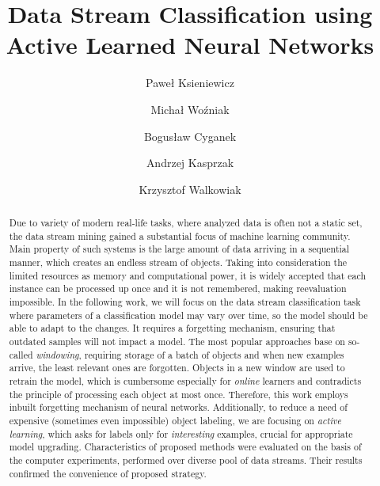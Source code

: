 \begin{frontmatter}

\title{Data Stream Classification using Active Learned Neural Networks}

\author[pwr]{Pawe\l{} Ksieniewicz}

\author[pwr]{Micha\l{} Wo\'zniak}

\author[bc]{Bogus\l{}aw Cyganek}

\author[pwr]{Andrzej Kasprzak}

\author[pwr]{Krzysztof Walkowiak}

\address[pwr]{Department of Systems and Computer Networks, Wroc\l{}aw University of Science and Technology, Wyb. Wyspia{\'n}skiego 27, 50-370 Wroc\l{}aw, Poland}
\address[bc]{AGH University of Science and Technology
Al. Mickiewicza 30, 30-059 Krak\'ow, Poland}


\begin{abstract}
Due to variety of modern real-life tasks, where analyzed data is often not a static set, the data stream mining gained a substantial focus of machine learning community. Main property of such systems is the large amount of data arriving in a sequential manner, which creates an endless stream of objects. %
Taking into consideration the limited resources as memory and computational power, it is widely accepted that each instance can be processed up once and it is not remembered, making reevaluation impossible.
In the following work, we will focus on the data stream classification task where parameters of a classification model may vary over time, so the model should be able to adapt to the changes. It requires a forgetting mechanism, ensuring that outdated samples will not impact a model. The most popular approaches base on so-called \emph{windowing}, requiring storage of a batch of objects and when new examples arrive, the least relevant ones are forgotten. Objects in a new window are used to retrain the model, which is cumbersome especially for \emph{online} learners and contradicts the principle of processing each object at most once. Therefore, this work employs inbuilt forgetting mechanism of neural networks. Additionally, to reduce a need of expensive (sometimes even impossible) object labeling, we are focusing on \emph{active learning}, which asks for labels only for \emph{interesting} examples, crucial for appropriate model upgrading. Characteristics of proposed methods were evaluated on the basis of the computer experiments, performed over diverse pool of data streams. Their results confirmed the convenience of proposed strategy.
\end{abstract}


\end{frontmatter}

